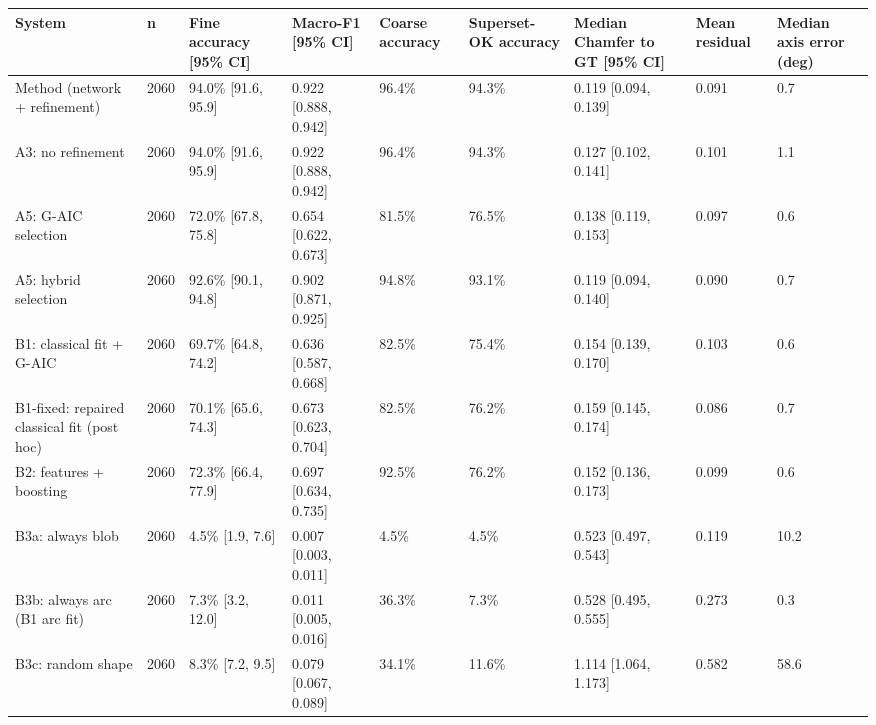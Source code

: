 \scriptsize
\begin{tabular}{lllllllll}
\toprule
\textbf{System} & \textbf{n} & \textbf{Fine accuracy [95\% CI]} & \textbf{Macro-F1 [95\% CI]} & \textbf{Coarse accuracy} & \textbf{Superset-OK accuracy} & \textbf{Median Chamfer to GT [95\% CI]} & \textbf{Mean residual} & \textbf{Median axis error (deg)} \\
\midrule
Method (network + refinement) & 2060 & 94.0\% [91.6, 95.9] & 0.922 [0.888, 0.942] & 96.4\% & 94.3\% & 0.119 [0.094, 0.139] & 0.091 & 0.7 \\
A3: no refinement & 2060 & 94.0\% [91.6, 95.9] & 0.922 [0.888, 0.942] & 96.4\% & 94.3\% & 0.127 [0.102, 0.141] & 0.101 & 1.1 \\
A5: G-AIC selection & 2060 & 72.0\% [67.8, 75.8] & 0.654 [0.622, 0.673] & 81.5\% & 76.5\% & 0.138 [0.119, 0.153] & 0.097 & 0.6 \\
A5: hybrid selection & 2060 & 92.6\% [90.1, 94.8] & 0.902 [0.871, 0.925] & 94.8\% & 93.1\% & 0.119 [0.094, 0.140] & 0.090 & 0.7 \\
B1: classical fit + G-AIC & 2060 & 69.7\% [64.8, 74.2] & 0.636 [0.587, 0.668] & 82.5\% & 75.4\% & 0.154 [0.139, 0.170] & 0.103 & 0.6 \\
B1-fixed: repaired classical fit (post hoc) & 2060 & 70.1\% [65.6, 74.3] & 0.673 [0.623, 0.704] & 82.5\% & 76.2\% & 0.159 [0.145, 0.174] & 0.086 & 0.7 \\
B2: features + boosting & 2060 & 72.3\% [66.4, 77.9] & 0.697 [0.634, 0.735] & 92.5\% & 76.2\% & 0.152 [0.136, 0.173] & 0.099 & 0.6 \\
B3a: always blob & 2060 & 4.5\% [1.9, 7.6] & 0.007 [0.003, 0.011] & 4.5\% & 4.5\% & 0.523 [0.497, 0.543] & 0.119 & 10.2 \\
B3b: always arc (B1 arc fit) & 2060 & 7.3\% [3.2, 12.0] & 0.011 [0.005, 0.016] & 36.3\% & 7.3\% & 0.528 [0.495, 0.555] & 0.273 & 0.3 \\
B3c: random shape & 2060 & 8.3\% [7.2, 9.5] & 0.079 [0.067, 0.089] & 34.1\% & 11.6\% & 1.114 [1.064, 1.173] & 0.582 & 58.6 \\
\bottomrule
\end{tabular}
